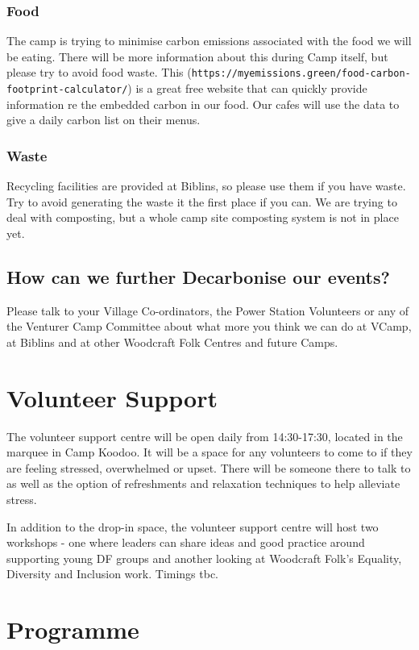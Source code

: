 \documentclass[a4paper, 11pt]{report}
\begin{document}
\subsection{Food}
The camp is trying to minimise carbon emissions associated with the food we will be eating. There will be more information about this during Camp itself, but please try to avoid food waste. This (\texttt{https://myemissions.green/food-carbon-footprint-calculator/}) is a great free website that can quickly provide information re the embedded carbon in our food. Our cafes will use the data to give a daily carbon list on their menus. 

\subsection{Waste}
Recycling facilities are provided at Biblins, so please use them if you have waste. Try to avoid generating the waste it the first place if you can. We are trying to deal with composting, but a whole camp site composting system is not in place yet.

\section{How can we further Decarbonise our events?}
Please talk to your Village Co-ordinators, the Power Station Volunteers or any of the Venturer Camp Committee about what more you think we can do at VCamp, at Biblins and at other Woodcraft Folk Centres and future Camps.

\chapter{Volunteer Support}
The volunteer support centre will be open daily from 14:30-17:30, located in the marquee in Camp Koodoo. It will be a space for any volunteers to come to if they are feeling stressed, overwhelmed or upset. There will be someone  there to talk to as well as the option of refreshments and relaxation techniques to help alleviate stress. \nl

In addition to the drop-in space, the volunteer support centre will host two workshops - one where leaders can share ideas and good practice around supporting young DF groups and another looking at Woodcraft Folk's Equality, Diversity and Inclusion work. Timings tbc.

\chapter{Programme}
\end{document}
